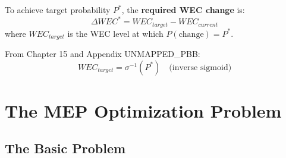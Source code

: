 \begin{definition}
\label{def:delta-wec}
To achieve target probability $P^*$, the \textbf{required WEC change} is:
\begin{equation}
\Delta WEC^* = WEC_{target} - WEC_{current}
\end{equation}
where $WEC_{target}$ is the WEC level at which $P(\text{change}) = P^*$.

From Chapter 15 and Appendix UNMAPPED_PBB:
\begin{equation}
WEC_{target} = \sigma^{-1}(P^*) \quad \text{(inverse sigmoid)}
\end{equation}
\end{definition}


\section{The MEP Optimization Problem}
\label{sec:mep-problem}

\subsection{The Basic Problem}

